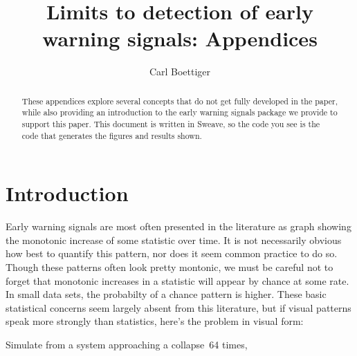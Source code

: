 \documentclass{elsarticle}
\begin{document}
\begin{frontmatter}
  \title{Limits to detection of early warning signals: Appendices}
  \author[davis]{Carl Boettiger}
  \address[davis]{Center for Population Biology, University of California, Davis, United States}

  \begin{abstract}
  These appendices explore several concepts that do not get fully developed in the paper, while also providing an introduction to the early warning signals package we provide to support this paper.  This document is written in Sweave, so the code you see is the code that generates the figures and results shown.   
  \end{abstract}
 \end{frontmatter}

\section{Introduction}






Early warning signals are most often presented in the literature as graph showing the monotonic increase of some statistic over time.  It is not necessarily obvious how best to quantify this pattern, nor does it seem common practice to do so.  Though these patterns often look pretty montonic, we must be careful not to forget that monotonic increases in a statistic will appear by chance at some rate.  In small data sets, the probabilty of a chance pattern is higher.  These basic statistical concerns seem largely absent from this literature, but if visual patterns speak more strongly than statistics, here's the problem in visual form:

Simulate from a system approaching a collapse~64 times,
\end{document}
